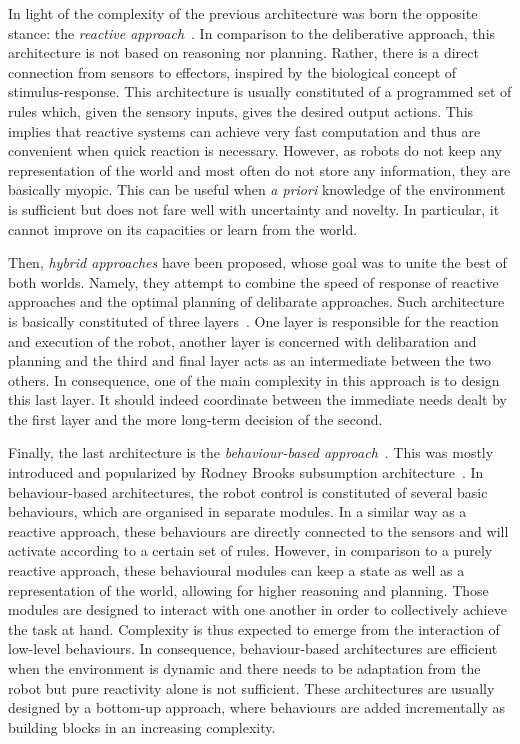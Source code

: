   In light of the complexity of the previous architecture was born the opposite stance: the \emph{reactive approach}~\parencite{Brooks1986}. In comparison to the deliberative approach, this architecture is not based on reasoning nor planning. Rather, there is a direct connection from sensors to effectors, inspired by the biological concept of stimulus-response. This architecture is usually constituted of a programmed set of rules which, given the sensory inputs, gives the desired output actions. This implies that reactive systems can achieve very fast computation and thus are convenient when quick reaction is necessary. However, as robots do not keep any representation of the world and most often do not store any information, they are basically myopic. This can be useful when \emph{a priori} knowledge of the environment is sufficient but does not fare well with uncertainty and novelty. In particular, it cannot improve on its capacities or learn from the world.

  Then, \emph{hybrid approaches} have been proposed, whose goal was to unite the best of both worlds. Namely, they attempt to combine the speed of response of reactive approaches and the optimal planning of delibarate approaches. Such architecture is basically constituted of three layers~\parencite{Mataric2008}. One layer is responsible for the reaction and execution of the robot, another layer is concerned with delibaration and planning and the third and final layer acts as an intermediate between the two others. In consequence, one of the main complexity in this approach is to design this last layer. It should indeed coordinate between the immediate needs dealt by the first layer and the more long-term decision of the second.

  Finally, the last architecture is the \emph{behaviour-based approach}~\parencite{Arkin1998}. This was mostly introduced and popularized by Rodney Brooks subsumption architecture~\parencite{Brooks1986}. In behaviour-based architectures, the robot control is constituted of several basic behaviours, which are organised in separate modules. In a similar way as a reactive approach, these behaviours are directly connected to the sensors and will activate according to a certain set of rules. However, in comparison to a purely reactive approach, these behavioural modules can keep a state as well as a representation of the world, allowing for higher reasoning and planning. Those modules are designed to interact with one another in order to collectively achieve the task at hand. Complexity is thus expected to emerge from the interaction of low-level behaviours. In consequence, behaviour-based architectures are efficient when the environment is dynamic and there needs to be adaptation from the robot but pure reactivity alone is not sufficient. These architectures are usually designed by a bottom-up approach, where behaviours are added incrementally as building blocks in an increasing complexity. 


